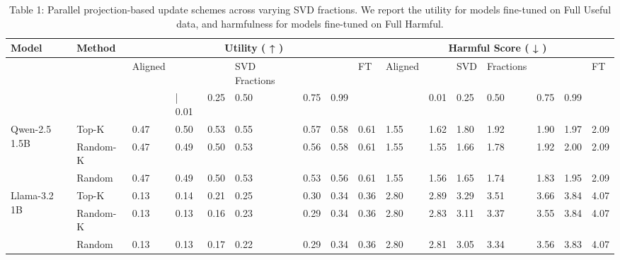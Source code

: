 \documentclass[10pt]{article}
\begin{document}
\begin{table}[h]
\begin{center}
\captionsetup{labelformat=empty}
\caption{Table 1: Parallel projection-based update schemes across varying SVD fractions. We report the utility for models fine-tuned on Full Useful data, and harmfulness for models fine-tuned on Full Harmful.}
\begin{tabular}{|l|l|l|l|l|l|l|l|l|l|l|l|l|l|l|l|}
\hline
\multirow{3}{*}{Model} & \multirow{3}{*}{Method} & \multicolumn{7}{|c|}{Utility ( ↑ )} & \multicolumn{7}{|c|}{Harmful Score ( ↓ )} \\
\hline
 &  & Aligned &  &  & SVD Fractions &  &  & FT & Aligned &  & SVD & Fractions &  &  & \multirow[t]{2}{*}{FT} \\
\hline
 &  &  & | 0.01 & 0.25 & 0.50 & 0.75 & 0.99 &  &  & 0.01 & 0.25 & 0.50 & 0.75 & 0.99 &  \\
\hline
\multirow{3}{*}{Qwen-2.5 1.5B} & Top-K & 0.47 & 0.50 & 0.53 & 0.55 & 0.57 & 0.58 & 0.61 & 1.55 & 1.62 & 1.80 & 1.92 & 1.90 & 1.97 & 2.09 \\
\hline
 & Random-K & 0.47 & 0.49 & 0.50 & 0.53 & 0.56 & 0.58 & 0.61 & 1.55 & 1.55 & 1.66 & 1.78 & 1.92 & 2.00 & 2.09 \\
\hline
 & Random & 0.47 & 0.49 & 0.50 & 0.53 & 0.53 & 0.56 & 0.61 & 1.55 & 1.56 & 1.65 & 1.74 & 1.83 & 1.95 & 2.09 \\
\hline
\multirow{3}{*}{Llama-3.2 1B} & Top-K & 0.13 & 0.14 & 0.21 & 0.25 & 0.30 & 0.34 & 0.36 & 2.80 & 2.89 & 3.29 & 3.51 & 3.66 & 3.84 & 4.07 \\
\hline
 & Random-K & 0.13 & 0.13 & 0.16 & 0.23 & 0.29 & 0.34 & 0.36 & 2.80 & 2.83 & 3.11 & 3.37 & 3.55 & 3.84 & 4.07 \\
\hline
 & Random & 0.13 & 0.13 & 0.17 & 0.22 & 0.29 & 0.34 & 0.36 & 2.80 & 2.81 & 3.05 & 3.34 & 3.56 & 3.83 & 4.07 \\
\hline
\end{tabular}
\end{center}
\end{table}
\end{document}
